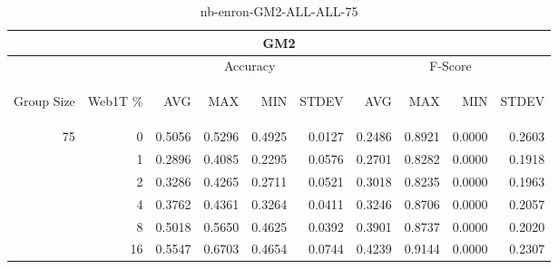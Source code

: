 \begin{center}
\begin{table}[htbp] 
 \begin{center}
\begin{tabular}{ | r | r | r | r | r | r | r | r | r | r |}
\hline
\multicolumn{10}{|c|}{GM2}\\
\hline
 & & \multicolumn{4}{|c|}{Accuracy} & \multicolumn{4}{|c|}{F-Score}\\ \cline{3-10}
\begin{sideways}Group Size\end{sideways} & \begin{sideways}Web1T \%\end{sideways} & \begin{sideways}AVG\end{sideways} & \begin{sideways}MAX\end{sideways} & \begin{sideways}MIN\end{sideways} & \begin{sideways}STDEV\end{sideways} & \begin{sideways}AVG\end{sideways} & \begin{sideways}MAX\end{sideways} & \begin{sideways}MIN\end{sideways} & \begin{sideways}STDEV\end{sideways}\\
\hline
\multirow{5}{*}{75}
 & 0 & 0.5056 & 0.5296 & 0.4925 & 0.0127 & 0.2486 & 0.8921 & 0.0000 & 0.2603\\ \cline{2-10}
 & 1 & 0.2896 & 0.4085 & 0.2295 & 0.0576 & 0.2701 & 0.8282 & 0.0000 & 0.1918\\ \cline{2-10}
 & 2 & 0.3286 & 0.4265 & 0.2711 & 0.0521 & 0.3018 & 0.8235 & 0.0000 & 0.1963\\ \cline{2-10}
 & 4 & 0.3762 & 0.4361 & 0.3264 & 0.0411 & 0.3246 & 0.8706 & 0.0000 & 0.2057\\ \cline{2-10}
 & 8 & 0.5018 & 0.5650 & 0.4625 & 0.0392 & 0.3901 & 0.8737 & 0.0000 & 0.2020\\ \cline{2-10}
 & 16 & 0.5547 & 0.6703 & 0.4654 & 0.0744 & 0.4239 & 0.9144 & 0.0000 & 0.2307\\ \cline{2-10}
\hline
\end{tabular}
\caption{nb-enron-GM2-ALL-ALL-75}
\label{table:nb-enron-GM2-ALL-ALL-75}
\end{center}
 \end{table}
\end{center}

